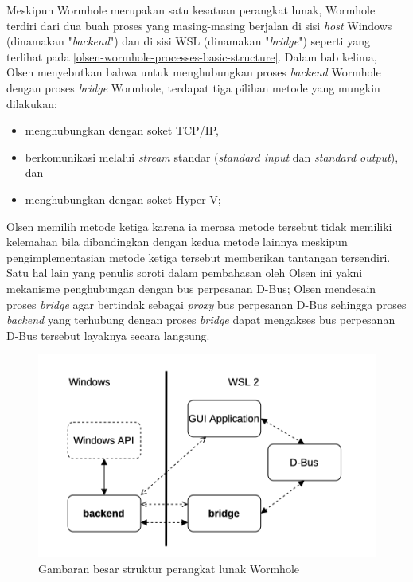 Meskipun Wormhole merupakan satu kesatuan perangkat lunak, Wormhole terdiri dari dua buah proses yang masing-masing berjalan di sisi \textit{host} Windows (dinamakan "\textit{backend}") dan di sisi WSL (dinamakan "\textit{bridge}") seperti yang terlihat pada \autoref{olsen-wormhole-processes-basic-structure}. Dalam bab kelima, Olsen menyebutkan bahwa untuk menghubungkan proses \textit{backend} Wormhole dengan proses \textit{bridge} Wormhole, terdapat tiga pilihan metode yang mungkin dilakukan:
\begin{itemize}
    \item menghubungkan dengan soket TCP/IP,
    \item berkomunikasi melalui \textit{stream} standar (\textit{standard input} dan \textit{standard output}), dan
    \item menghubungkan dengan soket Hyper-V;
\end{itemize}
Olsen memilih metode ketiga karena ia merasa metode tersebut tidak memiliki kelemahan bila dibandingkan dengan kedua metode lainnya meskipun pengimplementasian metode ketiga tersebut memberikan tantangan tersendiri. Satu hal lain yang penulis soroti dalam pembahasan oleh Olsen ini yakni mekanisme penghubungan dengan bus perpesanan D-Bus; Olsen mendesain proses \textit{bridge} agar bertindak sebagai \textit{proxy} bus perpesanan D-Bus sehingga proses \textit{backend} yang terhubung dengan proses \textit{bridge} dapat mengakses bus perpesanan D-Bus tersebut layaknya secara langsung.

\begin{figure}
    \centering
    \includegraphics[width=0.75\linewidth]{assets/Screenshot 2024-01-14 at 13.31.38.png}
    \caption{Gambaran besar struktur perangkat lunak Wormhole \cite{olsen-2022-through-the-wormhole}}
    \label{olsen-wormhole-processes-basic-structure}
\end{figure}

